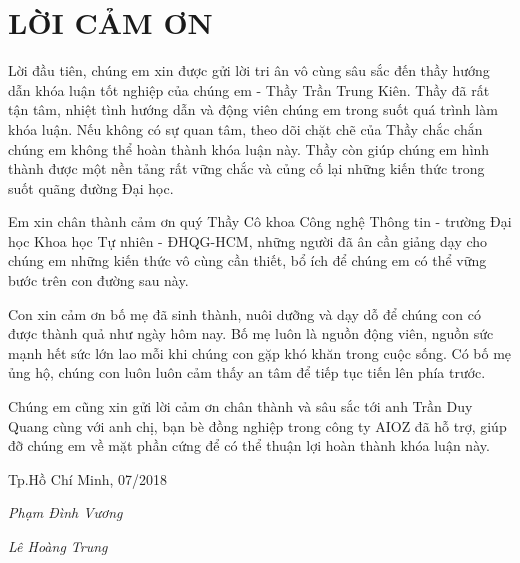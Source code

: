 \newpage
\chapter*{LỜI CẢM ƠN}
Lời đầu tiên, chúng em xin được gửi lời tri ân vô cùng sâu sắc đến thầy hướng dẫn khóa luận tốt nghiệp của chúng em - Thầy Trần Trung Kiên. Thầy đã rất tận tâm, nhiệt tình hướng dẫn và động viên chúng em trong suốt quá trình làm khóa luận. Nếu không có sự quan tâm, theo dõi chặt chẽ của Thầy chắc chắn chúng em không thể hoàn thành khóa luận này. Thầy còn giúp chúng em hình thành được một nền tảng rất vững chắc và củng cố lại những kiến thức trong suốt quãng đường Đại học.

Em xin chân thành cảm ơn quý Thầy Cô khoa Công nghệ Thông tin - trường Đại học Khoa học Tự nhiên - ĐHQG-HCM, những người đã ân cần giảng dạy cho chúng em những kiến thức vô cùng cần thiết, bổ ích để chúng em có thể vững bước trên con đường sau này.

Con xin cảm ơn bố mẹ đã sinh thành, nuôi dưỡng và dạy dỗ để chúng con có được thành quả như ngày hôm nay. Bố mẹ luôn là nguồn động viên, nguồn sức mạnh hết sức lớn lao mỗi khi chúng con gặp khó khăn trong cuộc sống. Có bố mẹ ủng hộ, chúng con luôn luôn cảm thấy an tâm để tiếp tục tiến lên phía trước.

Chúng em cũng xin gửi lời cảm ơn chân thành và sâu sắc tới anh Trần Duy Quang cùng với anh chị, bạn bè đồng nghiệp trong công ty AIOZ đã hỗ trợ, giúp đỡ chúng em về mặt phần cứng để có thể thuận lợi hoàn thành khóa luận này.



\hfill Tp.Hồ Chí Minh, 07/2018

\hfill \textit{Phạm Đình Vương}

\hfill \textit{Lê Hoàng Trung}
